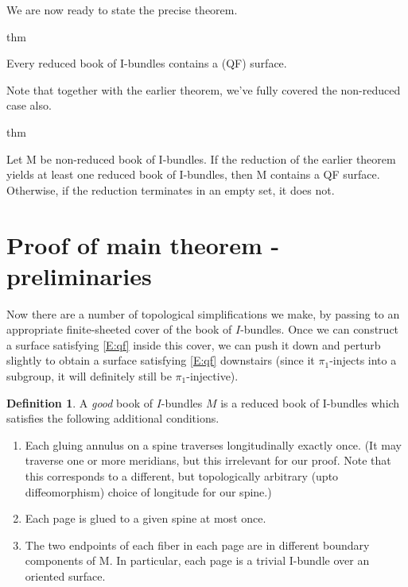 \documentclass[12pt]{amsart}
\theoremstyle{definition}
\newtheorem{defn}[theorem]{Definition}
\theoremstyle{remark}
\begin{document}
We are now ready to state the precise theorem.

thm

Every reduced book of I-bundles contains a (QF) surface.

Note that together with the earlier theorem, we've fully covered the
non-reduced case also.

thm

Let M be non-reduced book of I-bundles. If the reduction of the earlier theorem
yields at least one reduced book of I-bundles, then M contains a QF surface.
Otherwise, if the reduction terminates in an empty set, it does not.



\section{Proof of main theorem - preliminaries}

Now there are a number of topological simplifications we make, by passing to an
appropriate finite-sheeted cover of the book of $I$-bundles.  Once we can
construct a surface satisfying \eqref{E:qf} inside this cover, we can push it
down and perturb slightly to obtain a surface satisfying \eqref{E:qf}
downstairs (since it $\pi_1$-injects into a subgroup, it will definitely still
be $\pi_1$-injective).

\begin{defn}

A \emph{good} book of $I$-bundles $M$ is a reduced book of I-bundles which
satisfies the following additional conditions.

\begin{enumerate}

\item Each gluing annulus on a spine traverses longitudinally exactly once. (It
may traverse one or more meridians, but this irrelevant for our proof. Note
that this corresponds to a different, but topologically arbitrary (upto
diffeomorphism) choice of longitude for our spine.)

\item Each page is glued to a given spine at most once.

\item The two endpoints of each fiber in each page are in different boundary
components of M.  In particular, each page is a trivial I-bundle over an
oriented surface.

\end{enumerate}

\end{defn}
\end{document}
